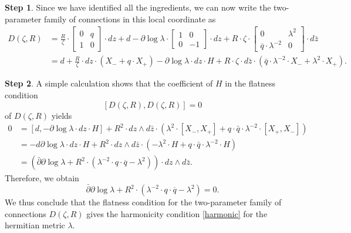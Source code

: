 \documentclass[oneside, 11pt]{amsart}
\theoremstyle{definition}
\newtheorem{step}{Step}
\numberwithin{equation}{subsection}
\def\lam{\lambda}
\newcommand{\be}{\begin{equation}}
\newcommand{\ee}{\end{equation}}
\begin{document}
{\begin{step}
Since we have identified all the ingredients, 
we can now write the
two-parameter family of 
connections in this local coordinate as
\begin{align*}
D(\zeta, R)&=\frac{R}{\zeta}\cdot \begin{bmatrix}
0 & q\\
1& 0
\end{bmatrix}\cdot dz+d-\partial \log \lambda\cdot \begin{bmatrix}
1 &0\\
0&-1
\end{bmatrix}\cdot dz+R \cdot \zeta \cdot \begin{bmatrix}
0 & \lambda^2\\
\overline{q}\cdot \lambda^{-2}& 0
\end{bmatrix}\cdot d\bar{z}
\\
&= d +\frac{R}{\zeta}\cdot dz \cdot (X_-+q \cdot X_+)
-\partial \log\lam\cdot  dz \cdot H+ R \cdot \zeta \cdot
d\bar{z} \cdot \left(\bar{q}\cdot\lam^{-2} \cdot
X_-+\lam^2 \cdot X_+\right).
\end{align*}
\end{step}

\begin{step}
A simple calculation shows that 
the coefficient of $H$ in the flatness condition 
$$
\left[D(\zeta, R), D(\zeta, R) \right]=0
$$ 
of $D(\zeta, R)$ yields
\begin{align*}
0 &= [d, -\partial \log\lam\cdot  dz \cdot H]
+R^2 \cdot dz\wedge d\bar{z}\cdot\left(\lam^2\cdot [X_-,X_+]
+q\cdot \bar{q}\cdot \lam^{-2}\cdot [X_+,X_-]\right)
\\
&=
-d\partial \log\lam\cdot dz \cdot H
+R^2 \cdot dz\wedge d\bar{z}\cdot \left(-\lam^2\cdot H
+q \cdot \bar{q} \cdot \lam^{-2} \cdot H\right)
\\
&=
\left(\bar{\partial}\partial\log \lam +R^2 \cdot (\lambda^{-2}\cdot q \cdot \overline{q} - \lambda^2)\right) \cdot dz\wedge d\bar{z}.
\end{align*}
Therefore, we obtain 
\be\label{harmonic}
\bar{\partial}\partial\log \lam +R^2 \cdot (\lambda^{-2}\cdot q \cdot \overline{q} - \lambda^2)= 0.
\ee
We thus conclude that the flatness condition for the two-parameter family of connections  $D(\zeta, R)$ gives the harmonicity condition 
\eqref{harmonic} for the hermitian metric $\lambda$.
\end{step}


}
\end{document}
